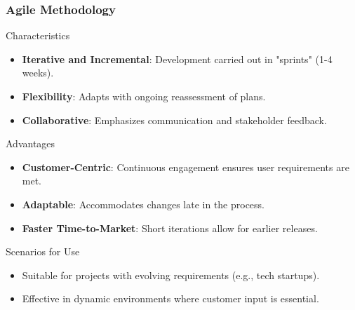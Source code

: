 \documentclass{beamer}
\begin{document}
\begin{frame}[fragile]
    \frametitle{Agile Methodology}
    \begin{block}{Characteristics}
        \begin{itemize}
            \item \textbf{Iterative and Incremental}: Development carried out in "sprints" (1-4 weeks).
            \item \textbf{Flexibility}: Adapts with ongoing reassessment of plans.
            \item \textbf{Collaborative}: Emphasizes communication and stakeholder feedback.
        \end{itemize}
    \end{block}
    
    \begin{block}{Advantages}
        \begin{itemize}
            \item \textbf{Customer-Centric}: Continuous engagement ensures user requirements are met.
            \item \textbf{Adaptable}: Accommodates changes late in the process.
            \item \textbf{Faster Time-to-Market}: Short iterations allow for earlier releases.
        \end{itemize}
    \end{block}
    
    \begin{block}{Scenarios for Use}
        \begin{itemize}
            \item Suitable for projects with evolving requirements (e.g., tech startups).
            \item Effective in dynamic environments where customer input is essential.
        \end{itemize}
    \end{block}
\end{frame}
\end{document}
